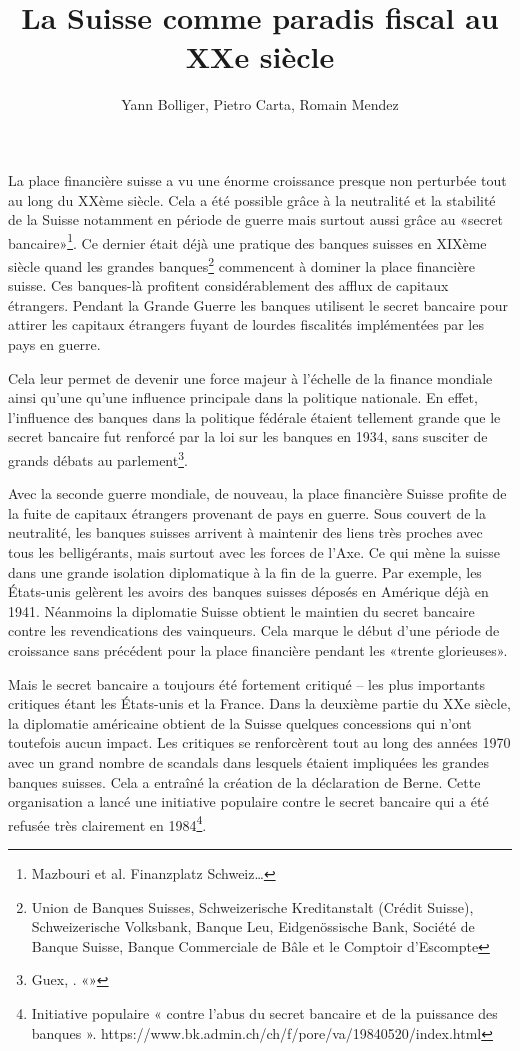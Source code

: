 \documentclass[ebook,9pt,oneside,openany]{memoir}
\title{La Suisse comme paradis fiscal au XXe siècle}
\author{Yann Bolliger, Pietro Carta, Romain Mendez}
\begin{document}
\maketitle

La place financière suisse a vu une énorme croissance presque non perturbée tout au long du XXème siècle. Cela a été possible grâce à la neutralité et la stabilité de la Suisse notamment en période de guerre mais surtout aussi grâce au «secret bancaire»\footnote{Mazbouri et al. Finanzplatz Schweiz…}. Ce dernier était déjà une pratique des banques suisses en XIXème siècle quand les grandes banques\footnote{Union de Banques Suisses, Schweizerische Kreditanstalt (Crédit Suisse), Schweizerische Volksbank, Banque Leu, Eidgenössische Bank, Société de Banque Suisse, Banque Commerciale de Bâle et le Comptoir d’Escompte} commencent à dominer la place financière suisse. Ces banques-là profitent considérablement des afflux de capitaux étrangers. Pendant la Grande Guerre les banques utilisent le secret bancaire pour attirer les capitaux étrangers fuyant de lourdes fiscalités implémentées par les pays en guerre.

Cela leur permet de devenir une force majeur à l’échelle de la finance mondiale ainsi qu’une qu’une influence principale dans la politique nationale.
En effet, l’influence des banques dans la politique fédérale étaient tellement grande que le secret bancaire fut renforcé par la loi sur les banques en 1934, sans susciter de grands débats au parlement\footnote{Guex, . «»}. 

Avec la seconde guerre mondiale, de nouveau, la place financière Suisse profite de la fuite de capitaux étrangers provenant de pays en guerre. Sous couvert de la neutralité, les banques suisses arrivent à maintenir des liens très proches avec tous les belligérants, mais surtout avec les forces de l’Axe. Ce qui mène la suisse dans une grande isolation diplomatique à la fin de la guerre. Par exemple, les États-unis gelèrent les avoirs des banques suisses déposés en Amérique déjà en 1941. Néanmoins la diplomatie Suisse obtient le maintien du secret bancaire contre les revendications des vainqueurs. Cela marque le début d’une période de croissance sans précédent pour la place financière pendant les «trente glorieuses».

Mais le secret bancaire a toujours été fortement critiqué – les plus importants critiques étant les États-unis et la France. Dans la deuxième partie du XXe siècle, la diplomatie américaine obtient de la Suisse quelques concessions qui n’ont toutefois aucun impact. Les critiques se renforcèrent tout au long des années 1970 avec un grand nombre de scandals dans lesquels étaient impliquées les grandes banques suisses. Cela a entraîné la création de la déclaration de Berne. Cette organisation a lancé une initiative populaire contre le secret bancaire qui a été refusée très clairement en 1984\footnote{Initiative populaire « contre l'abus du secret bancaire et de la puissance des banques ».  https://www.bk.admin.ch/ch/f/pore/va/19840520/index.html}.
\end{document}
